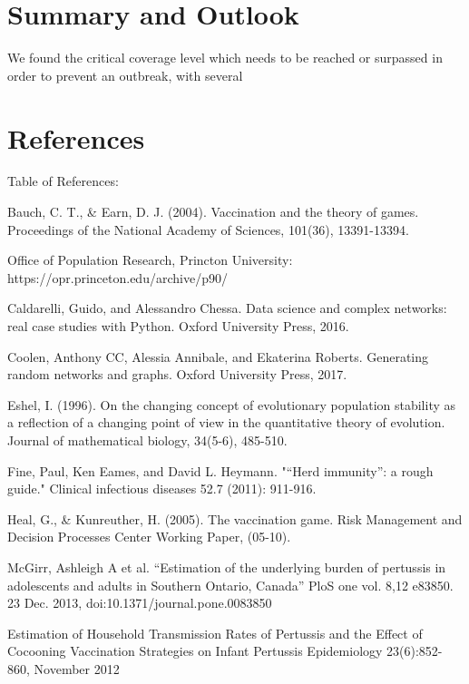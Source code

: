 \documentclass[11pt]{article}
\begin{document}
\section{Summary and Outlook}
We found the critical coverage level which needs to be reached or surpassed in order to prevent an outbreak, with several 

\section{References}
Table of References: 
\vspace{14px}

Bauch, C. T., \& Earn, D. J. (2004). Vaccination and the theory of games. Proceedings of the National Academy of Sciences, 101(36), 13391-13394.
\vspace{14px}

Office of Population Research, Princton University: https://opr.princeton.edu/archive/p90/

Caldarelli, Guido, and Alessandro Chessa. Data science and complex networks: real case studies with Python. Oxford University Press, 2016.

Coolen, Anthony CC, Alessia Annibale, and Ekaterina Roberts. Generating random networks and graphs. Oxford University Press, 2017.

Eshel, I. (1996). On the changing concept of evolutionary population stability as a reflection of a changing point of view in the quantitative theory of evolution. Journal of mathematical biology, 34(5-6), 485-510.
\vspace{14px}

Fine, Paul, Ken Eames, and David L. Heymann. "“Herd immunity”: a rough guide." Clinical infectious diseases 52.7 (2011): 911-916.
\vspace{14px}

Heal, G., \& Kunreuther, H. (2005). The vaccination game. Risk Management and Decision Processes Center Working Paper, (05-10). 
\vspace{14px}

McGirr, Ashleigh A et al. “Estimation of the underlying burden of pertussis in adolescents and adults in Southern Ontario, Canada” PloS one vol. 8,12 e83850. 23 Dec. 2013, doi:10.1371/journal.pone.0083850
\vspace{14px}

Estimation of Household Transmission Rates of Pertussis and the Effect of Cocooning Vaccination Strategies on Infant Pertussis Epidemiology 23(6):852-860, November 2012
\vspace{14px}
\end{document}
